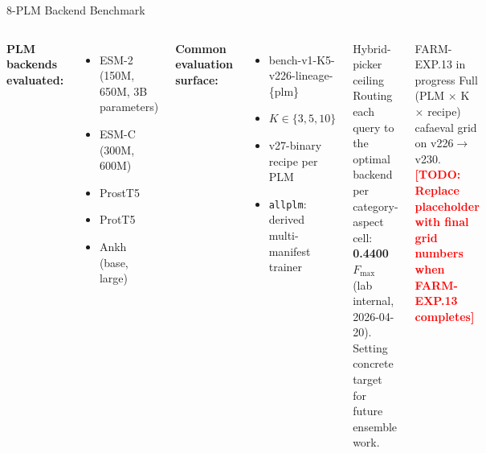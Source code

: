 \documentclass[12pt, aspectratio=169]{beamer}
\newcommand{\fmax}{$F_{\max}$}
\newcommand{\highlight}[1]{\textcolor{proteagreen}{\textbf{#1}}}
\newcommand{\todo}[1]{\textcolor{red}{\textbf{[TODO: #1]}}}
\begin{document}
\begin{frame}{8-PLM Backend Benchmark}
  \begin{columns}[t]
      \textbf{PLM backends evaluated:}
      \begin{itemize}
        \item ESM-2 (150M, 650M, 3B parameters)
        \item ESM-C (300M, 600M)
        \item ProstT5
        \item ProtT5
        \item Ankh (base, large)
      \end{itemize}
      \vspace{0.3em}
      \textbf{Common evaluation surface:}
      \begin{itemize}
        \item bench-v1-K5-v226-lineage-\{plm\}
        \item $K \in \{3, 5, 10\}$
        \item v27-binary recipe per PLM
        \item \texttt{allplm}: derived multi-manifest trainer
      \end{itemize}
      \begin{block}{Hybrid-picker ceiling}
        Routing each query to the optimal backend per category-aspect cell:
        \highlight{0.4400 \fmax} (lab internal, 2026-04-20).
        Setting concrete target for future ensemble work.
      \end{block}
      \vspace{0.5em}
      \begin{alertblock}{FARM-EXP.13 in progress}
        Full (PLM $\times$ K $\times$ recipe) cafaeval grid on v226$\to$v230.
        \todo{Replace placeholder with final grid numbers when FARM-EXP.13 completes}
      \end{alertblock}
  \end{columns}
\end{frame}
\end{document}
